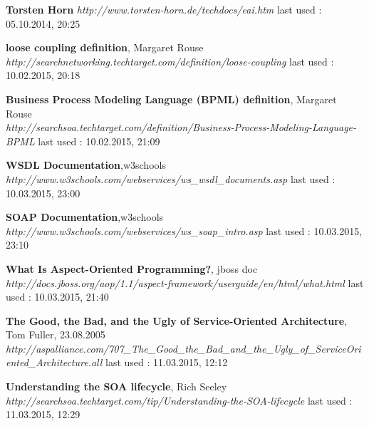 \documentclass[12pt]{article}
\begin{document}
\begin{thebibliography}{56}
   \textbf{Torsten Horn}\newline
  \textit{http://www.torsten-horn.de/techdocs/eai.htm}
  \newline last used : 05.10.2014, 20:25



 	 
 	 
   \textbf{loose coupling definition}, Margaret Rouse\\
  \textit{ 	 http://searchnetworking.techtarget.com/definition/loose-coupling}
  \newline last used : 10.02.2015, 20:18 	 
   	  
   \textbf{Business Process Modeling Language (BPML) definition}, Margaret Rouse\\
  \textit{http://searchsoa.techtarget.com/definition/Business-Process-Modeling-Language-BPML}
  \newline last used : 10.02.2015, 21:09

   	\textbf{WSDL Documentation},w3schools \\
    \textit{http://www.w3schools.com/webservices/ws\_wsdl\_documents.asp}
    \newline last used : 10.03.2015, 23:00

	\textbf{SOAP Documentation},w3schools \\
    \textit{http://www.w3schools.com/webservices/ws\_soap\_intro.asp}
    \newline last used : 10.03.2015, 23:10  
   	 
   	 
	\textbf{What Is Aspect-Oriented Programming?}, jboss doc \\
    \textit{http://docs.jboss.org/aop/1.1/aspect-framework/userguide/en/html/what.html 	 }
    \newline last used : 10.03.2015, 21:40  
   	 
	\textbf{The Good, the Bad, and the Ugly of Service-Oriented Architecture}, Tom Fuller, 23.08.2005 \\
    \textit{http://aspalliance.com/707\_The\_Good\_the\_Bad\_and\_the\_Ugly\_of\_ServiceOriented\_Architecture.all}
    \newline last used : 11.03.2015, 12:12  
 	 
 	  	 
   \textbf{Understanding the SOA lifecycle},  Rich Seeley\\
  \textit{ 	 http://searchsoa.techtarget.com/tip/Understanding-the-SOA-lifecycle}
  \newline last used : 11.03.2015, 12:29 	 
   	  

\end{thebibliography}
\end{document}
